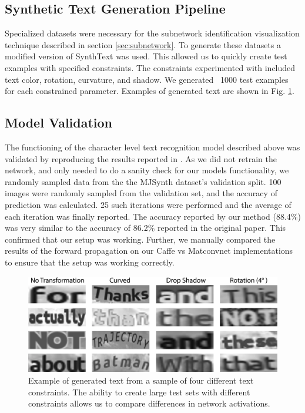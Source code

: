 \documentclass[10pt,twocolumn,letterpaper]{article}
\begin{document}
\subsection{Synthetic Text Generation Pipeline} \label{sec:synthtext}
Specialized datasets were necessary for the subnetwork identification visualization technique described in section \ref{sec:subnetwork}.
To generate these datasets a modified version of SynthText \cite{Gupta16} was used. This allowed us to quickly create test examples with specified constraints. The constraints experimented with included text color, rotation, curvature, and shadow. We generated ~1000 test examples for each constrained parameter. Examples of generated text are shown in Fig. \ref{fig:genText}.


\subsection{Model Validation}
The functioning of the character level text recognition model described above was validated by reproducing the results reported in \cite{Jaderberg14c}. As we did not retrain the network, and only needed to do a sanity check for our models functionality, we randomly sampled data from the the MJSynth dataset's validation split. 100 images were randomly sampled from the validation set, and the accuracy of prediction was calculated. 25 such iterations were performed and the average of each iteration was finally reported. The accuracy reported by our method (88.4$\%$) was very similar to the accuracy of 86.2$\%$ reported in the original paper. This confirmed that our setup was working. Further, we manually compared the results of the forward propagation on our Caffe vs Matconvnet implementations to ensure that the setup was working correctly.


\begin{figure}
\includegraphics[width=\columnwidth]{Figures/synthtext_outputs/synthext_outputs.png}
\caption{Example of generated text from a sample of four different text constraints. The ability to create large test sets with different constraints allows us to compare differences in network activations.}
\label{fig:genText}
\end{figure}
\end{document}
